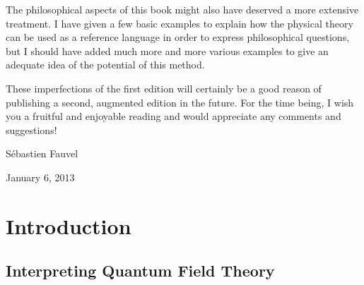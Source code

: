 \documentclass[10pt,a4paper,twoside,openany]{book}
\begin{document}
The philosophical aspects of this book might also have deserved a more extensive treatment. I have given a few basic examples to explain how the physical theory can be used as a reference language in order to express philosophical questions, but I should have added much more and more various examples to give an adequate idea of the potential of this method. 

These imperfections of the first edition will certainly be a good reason of publishing a second, augmented edition in the future. For the time being, I wish you a fruitful and enjoyable reading and would appreciate any comments and suggestions!

Sébastien Fauvel

January 6, 2013

\cleardoublepage
\tableofcontents

\chapter{Introduction}

\section*{Interpreting Quantum Field Theory}
\end{document}
